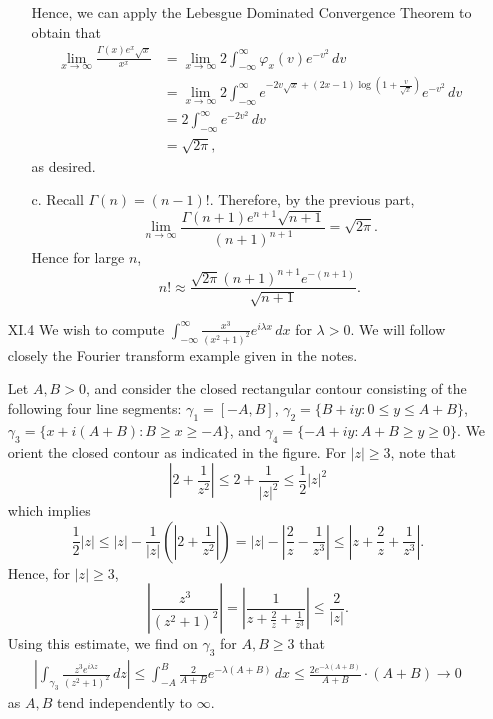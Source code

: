 \documentclass[11pt]{book}
\theoremstyle{definition}
\begin{document}
\begin{enumerate}
\begin{enumerate}
              Hence, we can apply the Lebesgue Dominated Convergence Theorem to obtain that 
              \begin{align*}
                \lim_{x\to \infty} \frac{\Gamma(x)e^x \sqrt x}{x^x} &=   \lim_{x\to \infty} 2 \int_{-\infty}^\infty \varphi_x(v) e^{-v^2} \, dv \\
                &=  \lim_{x\to \infty} 2 \int_{-\infty}^\infty e^{-2v\sqrt x + (2x-1)\log ( 1+\frac{v}{\sqrt x})}  e^{-v^2} \, dv \\
                &= 2\int_{-\infty}^\infty  e^{-2v^2} \, dv \\
                &= \sqrt{2\pi},
              \end{align*}
              as desired. 
        \item[c.]  Recall $\Gamma(n) = (n-1)!$.  Therefore, by the previous part, 
          \[ \lim_{n\to \infty} \frac{\Gamma(n+1)e^{n+1}\sqrt{n+1}}{(n+1)^{n+1}} = \sqrt{2\pi}. \] Hence for large $n$,
          \[ n! \approx  \frac{\sqrt{2\pi} (n+1)^{n+1}e^{-(n+1)}}{\sqrt{n+1}}.\] 
    \end{enumerate}
  \item[XI.4]  We wish to compute $\int_{-\infty}^\infty \frac{x^3}{(x^2+1)^2}e^{i\lambda x} \, dx$ for $\lambda > 0$.   We will follow closely the Fourier transform example given in the notes.  

    Let $A,B > 0$, and consider the closed rectangular contour consisting of the following four line segments: $\gamma_1 = [-A, B]$, $\gamma_2 = \{ B + iy : 0 \leq y \leq A + B \}$, $\gamma_3 = \{ x + i(A+B) : B \geq x \geq -A \}$, and $\gamma_4 = \{ -A  + iy  : A + B \geq y \geq 0\}$.  We orient the closed contour as indicated in the figure.    For $|z|\geq 3$, note that 
    \[ \left| 2 + \frac{1}{z^2} \right| \leq 2 + \frac{1}{|z|^2} \leq \frac{1}{2} |z|^2 \] which implies
    \[ \frac{1}{2}|z| \leq |z| - \frac{1}{|z|} \left( \left| 2 + \frac{1}{z^2} \right| \right) = |z| - \left| \frac{2}{z} - \frac{1}{z^3} \right| \leq \left| z + \frac{2}{z} + \frac{1}{z^3} \right|.  \]  Hence, for $|z| \geq 3$, 
    \[ \left | \frac{z^3}{(z^2+1)^2} \right| = \left| \frac{1}{z+\frac{2}{z} + \frac{1}{z^3}} \right| \leq \frac{2}{|z|} . \]  
    Using this estimate, we find on $\gamma_3$ for $A,B\geq 3$ that 
    \begin{align*}
      \left| \int_{\gamma_3} \frac{z^3e^{i\lambda z}}{(z^2+1)^2} \, dz \right| \leq \int_{-A}^B \frac{2}{A+B} e^{-\lambda (A+B)} \, dx 
      \leq \frac{2e^{-\lambda (A+B)}}{A+B} \cdot (A+B)  \to 0
    \end{align*} 
    as $A,B$ tend independently to $\infty$. 


\end{enumerate}
\end{document}
